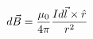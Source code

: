 \documentclass[preview]{standalone}
\begin{document}
\begin{align*}
d \vec{B} = {\mu_0 \over 4\pi} {I d\vec{l} \times \hat{r} \over {r}^2}
\end{align*}
\end{document}
